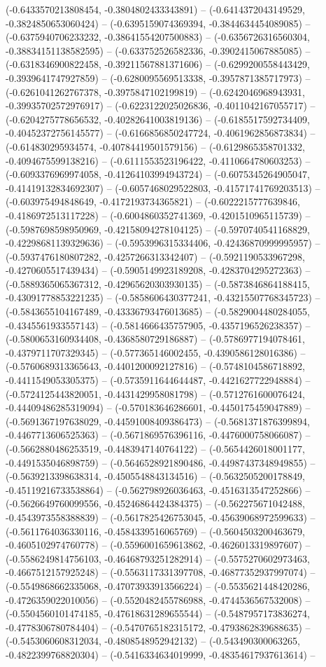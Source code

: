 (-0.6433570213808454, -0.3804802433343891) -- (-0.6414372043149529, -0.3824850653060424) -- (-0.6395159074369394, -0.3844634454089085) -- (-0.6375940706233232, -0.38641554207500883) -- (-0.6356726316560304, -0.38834151138582595) -- (-0.633752526582336, -0.3902415067885085) -- (-0.6318346900822458, -0.39211567881371606) -- (-0.6299200558443429, -0.3939641747927859) -- (-0.6280095569513338, -0.3957871385717973) -- (-0.6261041262767378, -0.3975847102199819) -- (-0.6242046968943931, -0.39935702572976917) -- (-0.6223122025026836, -0.4011042167055717) -- (-0.6204275778656532, -0.40282641003819136) -- (-0.6185517592734409, -0.40452372756145577) -- (-0.6166856850247724, -0.4061962856873834) -- (-0.614830295934574, -0.40784419501579156) -- (-0.6129865358701332, -0.4094675599138216) -- (-0.6111553523196422, -0.4110664780603253) -- (-0.6093376969974058, -0.41264103994943724) -- (-0.6075345264905047, -0.41419132834692307) -- (-0.6057468029522803, -0.41571741769203513) -- (-0.603975494848649, -0.4172193734365821) -- (-0.6022215777639846, -0.4186972513117228) -- (-0.6004860352741369, -0.4201510965115739) -- (-0.5987698598950969, -0.42158094278104125) -- (-0.5970740541168829, -0.42298681139329636) -- (-0.5953996315334406, -0.42436870999995957) -- (-0.5937476180807282, -0.4257266313342407) -- (-0.5921190533967298, -0.4270605517439434) -- (-0.5905149923189208, -0.4283704295272363) -- (-0.5889365065367312, -0.42965620303930135) -- (-0.5873846864188415, -0.43091778853221235) -- (-0.5858606430377241, -0.43215507768345723) -- (-0.5843655104167489, -0.43336793476013685) -- (-0.5829004480284055, -0.4345561933557143) -- (-0.5814666435757905, -0.4357196526238357) -- (-0.5800653160934408, -0.4368580729186887) -- (-0.5786977194078461, -0.4379711707329345) -- (-0.577365146002455, -0.4390586128016386) -- (-0.5760689313365643, -0.4401200092127816) -- (-0.5748104586718892, -0.4411549053305375) -- (-0.5735911644644487, -0.4421627722948884) -- (-0.5724125443820051, -0.4431429958081798) -- (-0.5712761600076424, -0.44409486285319094) -- (-0.570183646286601, -0.4450175459047889) -- (-0.5691367197638029, -0.44591008409386473) -- (-0.5681371876399894, -0.4467713606525363) -- (-0.5671869576396116, -0.4476000758066087) -- (-0.5662880486253519, -0.4483947140764122) -- (-0.5654426018001177, -0.4491535046898759) -- (-0.5646528921890486, -0.44987437348949855) -- (-0.5639213398638314, -0.4505548843134516) -- (-0.5632505200178849, -0.45119216733538864) -- (-0.562798926036463, -0.4516313547252866) -- (-0.5626649760099556, -0.45246864424384375) -- (-0.562275671042488, -0.4543973558388839) -- (-0.5617825426753045, -0.45639068972599633) -- (-0.5611764036330116, -0.4584339516065769) -- (-0.5604503200463679, -0.4605102974760778) -- (-0.5596001659613862, -0.4626013319897607) -- (-0.5586249814756103, -0.46468793251282914) -- (-0.5575270602973463, -0.4667512157925248) -- (-0.5563117331397708, -0.46877352937997074) -- (-0.5549868662335068, -0.47073933913566224) -- (-0.5535621448420286, -0.4726359022010056) -- (-0.5520482455786988, -0.4744536567532008) -- (-0.5504560101474185, -0.47618631289655544) -- (-0.5487957173836274, -0.4778306780784404) -- (-0.5470765182315172, -0.4793862839688635) -- (-0.5453060608312034, -0.4808548952942132) -- (-0.543490300063265, -0.4822399768820304) -- (-0.5416334634019999, -0.48354617937613614) -- 